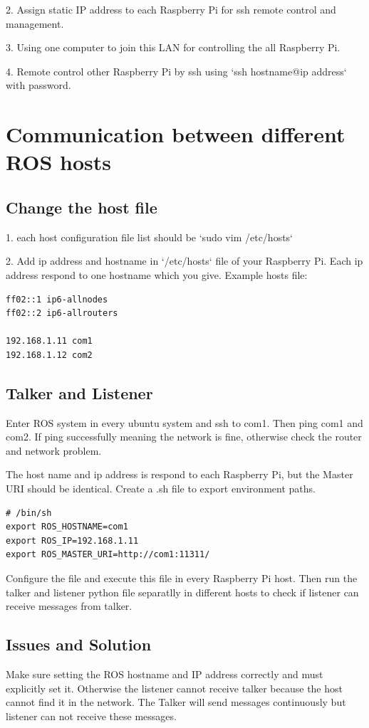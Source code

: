 \documentclass{mproj}
\begin{document}
2. Assign static IP address to each Raspberry Pi for ssh remote control and management.

3. Using one computer to join this LAN for controlling the all Raspberry Pi.

4. Remote control other Raspberry Pi by ssh using `ssh {hostname}@{ip address}` with password.


\section{Communication between different ROS hosts}
\subsection{Change the host file}
1. each host configuration file list should be  
    `sudo vim /etc/hosts`
    
2. Add ip address and hostname in `/etc/hosts` file of your Raspberry Pi. Each ip address respond to one hostname which you give.
Example hosts file:

\begin{verbatim}
ff02::1 ip6-allnodes
ff02::2 ip6-allrouters

192.168.1.11 com1
192.168.1.12 com2
\end{verbatim}

\subsection{Talker and Listener}
Enter ROS system in every ubuntu system and ssh to com1. Then ping com1 and com2. If ping successfully meaning the network is fine, otherwise check the router and network problem.

The host name and ip address is respond to each Raspberry Pi, but the Master URI should be identical. Create a .sh file to export environment paths.
\begin{verbatim}
# /bin/sh
export ROS_HOSTNAME=com1
export ROS_IP=192.168.1.11
export ROS_MASTER_URI=http://com1:11311/
\end{verbatim}

Configure the file and execute this file in every Raspberry Pi host. Then run the talker and listener python file separatlly in different hosts to check if listener can receive messages from talker.

\subsection{Issues and Solution}
Make sure setting the ROS hostname and IP address correctly and must explicitly set it. Otherwise the listener cannot receive talker because the host cannot find it in the network. The Talker will send messages continuously but listener can not receive these messages.
\end{document}
